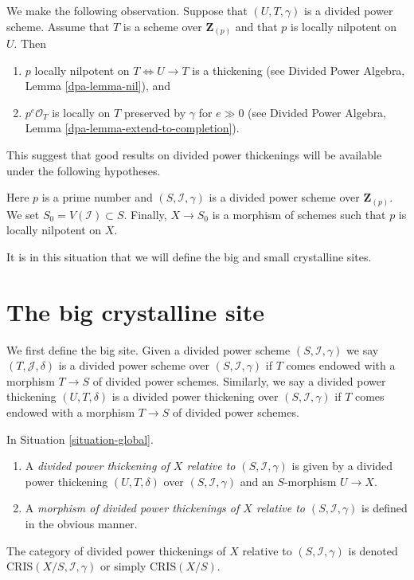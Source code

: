 \noindent
We make the following observation. Suppose that $(U, T, \gamma)$
is a divided power scheme. Assume that $T$ is a scheme over $\mathbf{Z}_{(p)}$
and that $p$ is locally nilpotent on $U$. Then
\begin{enumerate}
\item $p$ locally nilpotent on $T \Leftrightarrow U \to T$
is a thickening (see Divided Power Algebra, Lemma \ref{dpa-lemma-nil}), and
\item $p^e\mathcal{O}_T$ is locally on $T$ preserved by $\gamma$
for $e \gg 0$ (see
Divided Power Algebra, Lemma \ref{dpa-lemma-extend-to-completion}).
\end{enumerate}
This suggest that good results on divided power thickenings will be
available under the following hypotheses.

\begin{situation}
\label{situation-global}
Here $p$ is a prime number and $(S, \mathcal{I}, \gamma)$ is a divided power
scheme over $\mathbf{Z}_{(p)}$. We set $S_0 = V(\mathcal{I}) \subset S$.
Finally, $X \to S_0$ is a morphism of schemes such that $p$ is
locally nilpotent on $X$.
\end{situation}

\noindent
It is in this situation that we will define the big and small
crystalline sites.









\section{The big crystalline site}
\label{section-big-site}

\noindent
We first define the big site. Given a divided power scheme
$(S, \mathcal{I}, \gamma)$ we say $(T, \mathcal{J}, \delta)$ is
a divided power scheme over $(S, \mathcal{I}, \gamma)$ if
$T$ comes endowed with a morphism $T \to S$ of divided power
schemes. Similarly, we say a divided power thickening $(U, T, \delta)$
is a divided power thickening over $(S, \mathcal{I}, \gamma)$
if $T$ comes endowed with a morphism $T \to S$ of divided power
schemes.

\begin{definition}
\label{definition-divided-power-thickening-X}
In Situation \ref{situation-global}.
\begin{enumerate}
\item A {\it divided power thickening of $X$ relative to
$(S, \mathcal{I}, \gamma)$} is given by a divided power thickening
$(U, T, \delta)$ over $(S, \mathcal{I}, \gamma)$
and an $S$-morphism $U \to X$.
\item A {\it morphism of divided power thickenings of $X$
relative to $(S, \mathcal{I}, \gamma)$} is defined in the obvious
manner.
\end{enumerate}
The category of divided power thickenings of $X$ relative to
$(S, \mathcal{I}, \gamma)$ is denoted $\text{CRIS}(X/S, \mathcal{I}, \gamma)$
or simply $\text{CRIS}(X/S)$.
\end{definition}

